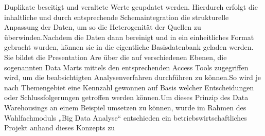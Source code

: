 \documentclass[sigconf]{acmart}
\begin{document}
Duplikate beseitigt und veraltete Werte geupdatet werden. Hierdurch erfolgt die inhaltliche und  durch entsprechende Schemaintegration die strukturelle Anpassung der Daten, um so die Heterogenität der Quellen zu überwinden.\newline Nachdem die Daten dann bereinigt und in ein einheitliches Format gebracht wurden, können sie in die eigentliche Basisdatenbank geladen werden. Sie bildet die Presentation Are über die auf verschiedenen Ebenen, die sogenannten Data Marts mittels den entsprechenden Access Tools zugegriffen wird, um die beabsichtigten Analysenverfahren durchführen zu können.\newline So wird je nach Themengebiet eine Kennzahl gewonnen auf Basis welcher Entscheidungen oder Schlussfolgerungen getroffen werden können.\newline Um dieses Prinzip des Data Warehousings an einem Beispiel umsetzen zu können, wurde im Rahmen des Wahlfachmoduls „Big Data Analyse“ entschieden ein betriebswirtschaftliches Projekt anhand dieses Konzepts zu 
\end{document}
